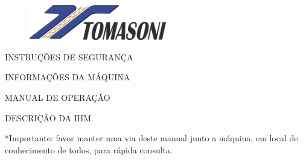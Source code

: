 \thispagestyle{empty}
\setcounter{page}{0}

\begin{figure}[h]
    \begin{minipage}{0.4\textwidth}
    \includegraphics[width=6cm]{logoTomasoni.png}
    \end{minipage}
    \hspace{0.5cm}
\end{figure}
    

\vspace*{\fill}
\begin{center}
    \huge\textbf{\machineName}
\end{center}
\begin{center}
    \Large{INSTRUÇÕES DE SEGURANÇA}
\end{center}
\begin{center}
    \Large{INFORMAÇÕES DA MÁQUINA}
\end{center}
\begin{center}
    \Large{MANUAL DE OPERAÇÃO}
\end{center}
\begin{center}
    \Large{DESCRIÇÃO DA IHM}
\end{center}

\vspace*{\fill}

*Importante: favor manter uma via deste manual junto a máquina, em local de conhecimento de todos, para rápida consulta.


